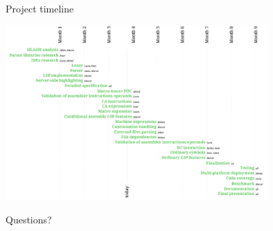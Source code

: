 \documentclass[10pt]{beamer}
\begin{document}
\begin{frame}[fragile]{Project timeline}

\centering
\includegraphics[width=10cm]{img/timeline}

\end{frame}


\begin{frame}[standout]
  Questions?
\end{frame}
\end{document}
